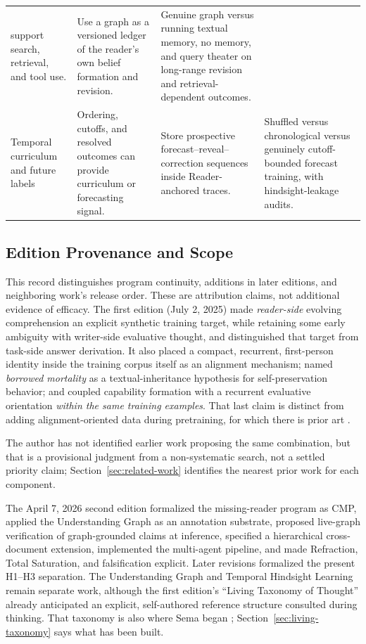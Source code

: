 \documentclass[11pt]{article}
\begin{document}
\begin{longtable}{
  >{\raggedright\arraybackslash}p{2.8cm}
  >{\raggedright\arraybackslash}p{3.7cm}
  >{\raggedright\arraybackslash}p{4.0cm}
  >{\raggedright\arraybackslash}p{4.3cm}}
support search, retrieval, and tool use. & Use a graph as a versioned ledger of
the reader's own belief formation and revision. & Genuine graph versus running
textual memory, no memory, and query theater on long-range revision and
retrieval-dependent outcomes. \\
\addlinespace
Temporal curriculum and future labels & Ordering, cutoffs, and resolved
outcomes can provide curriculum or forecasting signal. & Store prospective
forecast--reveal--correction sequences inside Reader-anchored traces. &
Shuffled versus chronological versus genuinely cutoff-bounded forecast training,
with hindsight-leakage audits. \\
\end{longtable}
\endgroup

	\subsection{Edition Provenance and Scope}\label{sec:edition-provenance}

This record distinguishes program continuity, additions in later editions,
and neighboring work's release order. These are attribution claims, not
additional evidence of efficacy. The first edition (July 2, 2025) made
\emph{reader-side} evolving comprehension an explicit synthetic training
target, while retaining some early ambiguity with writer-side evaluative
thought, and distinguished that target from task-side answer derivation. It
also placed a compact, recurrent, first-person identity inside the training
corpus itself as an alignment mechanism; named \emph{borrowed mortality} as a
textual-inheritance hypothesis for self-preservation behavior; and coupled
capability formation with a recurrent evaluative orientation \emph{within the
same training examples}. That last claim is distinct from adding
alignment-oriented data during pretraining, for which there is prior art
\cite{korbak2023pretraining,maini2025safetypretraining}.

The author has not identified earlier work proposing the same combination, but
that is a provisional judgment from a non-systematic search, not a settled
priority claim; Section~\ref{sec:related-work} identifies the nearest prior work
for each component.

The April 7, 2026 second edition formalized the missing-reader program as CMP,
applied the Understanding Graph as an annotation substrate, proposed live-graph
verification of graph-grounded claims at inference, specified a hierarchical
cross-document extension, implemented the multi-agent pipeline, and made
Refraction, Total Saturation, and falsification explicit. Later revisions
formalized the present H1--H3 separation. The Understanding Graph and Temporal
Hindsight Learning remain separate work, although the first edition's ``Living
Taxonomy of Thought'' already anticipated an explicit, self-authored reference
structure consulted during thinking. That taxonomy is also where Sema began
\cite{westerberg2026sema}; Section~\ref{sec:living-taxonomy} says what has been
built.
\end{document}
